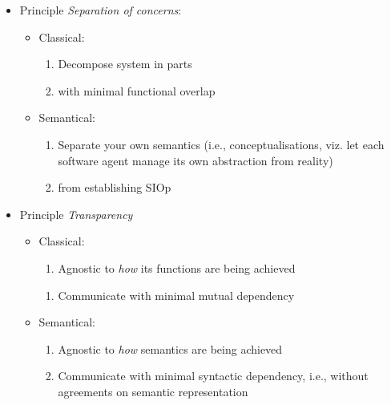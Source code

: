 \documentclass[a4paper,11pt,oneside,oldfontcommands]{memoir}
\newcounter{para}
\theoremstyle{definition}
\theoremstyle{break}		%
\numberwithin{equation}{chapter}
\numberwithin{figure}{chapter}
\begin{document}
\begin{itemize}
\tightlist
\item
  Principle \emph{Separation of concerns}:

  \begin{itemize}
  \tightlist
  \item
    Classical:

    \begin{enumerate}
    \def\labelenumi{\roman{enumi}.}
    \tightlist
    \item
      Decompose system in parts
    \item
      with minimal functional overlap
    \end{enumerate}
  \item
    Semantical:

    \begin{enumerate}
    \def\labelenumi{\roman{enumi}.}
    \tightlist
    \item
      Separate your own semantics (i.e., conceptualisations, viz. let
      each software agent manage its own abstraction from reality)
    \item
      from establishing SIOp
    \end{enumerate}
  \end{itemize}
\item
  Principle \emph{Transparency}

  \begin{itemize}
  \tightlist
  \item
    Classical:

    \begin{enumerate}
    \def\labelenumi{\roman{enumi}.}
    \tightlist
    \item
      Agnostic to \emph{how} its functions are being achieved
    \end{enumerate}

    \begin{enumerate}
    \def\labelenumi{\arabic{enumi}.}
    \tightlist
    \item
      Communicate with minimal mutual dependency
    \end{enumerate}
  \item
    Semantical:

    \begin{enumerate}
    \def\labelenumi{\roman{enumi}.}
    \tightlist
    \item
      Agnostic to \emph{how} semantics are being achieved
    \item
      Communicate with minimal syntactic dependency, i.e., without
      agreements on semantic representation
    \end{enumerate}
  \end{itemize}
\end{itemize}
\end{document}
